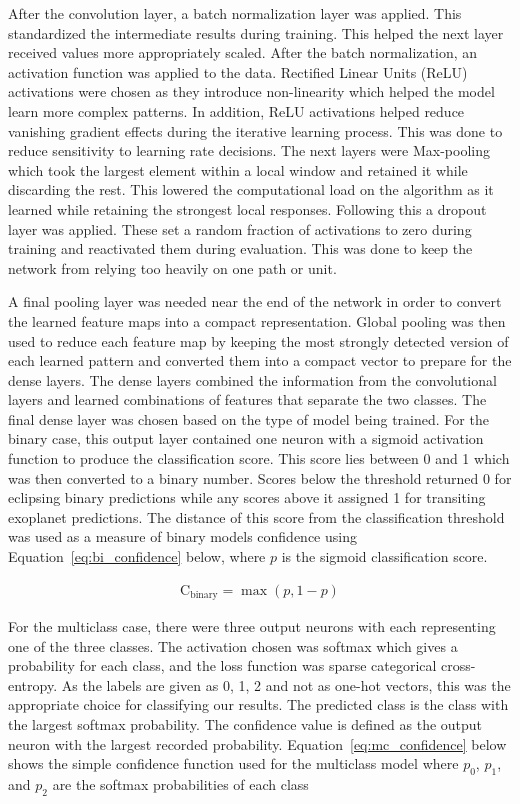 After the convolution layer, a batch normalization layer was applied. This standardized the intermediate results during training. This helped the next layer received values more appropriately scaled. After the batch normalization, an activation function was applied to the data. Rectified Linear Units (ReLU) activations were chosen as they introduce non-linearity which helped the model learn more complex patterns. In addition, ReLU activations helped reduce vanishing gradient effects during the iterative learning process. This was done to reduce sensitivity to learning rate decisions. The next layers were Max-pooling which took the largest element within a local window and retained it while discarding the rest. This lowered the computational load on the algorithm as it learned while retaining the strongest local responses. Following this a dropout layer was applied. These set a random fraction of activations to zero during training and reactivated them during evaluation. This was done to keep the network from relying too heavily on one path or unit. 

A final pooling layer was needed near the end of the network in order to convert the learned feature maps into a compact representation. Global pooling was then used to reduce each feature map by keeping the most strongly detected version of each learned pattern and converted them into a compact vector to prepare for the dense layers. The dense layers combined the information from the convolutional layers and learned combinations of features that separate the two classes. The final dense layer was chosen based on the type of model being trained. For the binary case, this output layer contained one neuron with a sigmoid activation function to produce the classification score. This score lies between 0 and 1 which was then converted to a binary number. Scores below the threshold returned 0 for eclipsing binary predictions while any scores above it assigned 1 for transiting exoplanet predictions. The distance of this score from the classification threshold was used as a measure of binary models confidence using Equation~\ref{eq:bi_confidence} below, where $p$ is the sigmoid classification score. 

\begin{align}
     \text{C}_{\text{binary}} = \max{(p, 1-p)}\label{eq:bi_confidence}
\end{align}

For the multiclass case, there were three output neurons with each representing one of the three classes. The activation chosen was softmax which gives a probability for each class, and the loss function was sparse categorical cross-entropy. As the labels are given as 0, 1, 2 and not as one-hot vectors, this was the appropriate choice for classifying our results. The predicted class is the class with the largest softmax probability. The confidence value is defined as the output neuron with the largest recorded probability. Equation~\ref{eq:mc_confidence} below shows the simple confidence function used for the multiclass model where $p_0$, $p_1$, and $p_2$ are the softmax probabilities of each class

